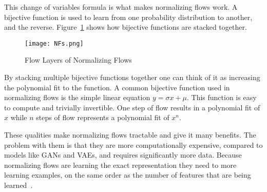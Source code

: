 This change of variables formula is what makes normalizing flows work. A
bijective function is used to learn from one probability distribution to
another, and the reverse. Figure~\ref{fig:nf} shows how bijective functions are
stacked together.

\begin{figure}[ht]
\center\texttt{[image: NFs.png]}
\caption{Flow Layers of Normalizing Flows~\cite{weng2018flow}}
\label{fig:nf}
\end{figure}

By stacking multiple bijective functions together one can think of it as
increasing the polynomial fit to the function. A common bijective function used
in normalizing flows is the simple linear equation $y = \sigma x + \mu$. This
function is easy to compute and trivially invertible. One step of flow results
in a polynomial fit of $x$ while $n$ steps of flow represents a polynomial fit
of $x^n$. 

These qualities make normalizing flows tractable and give it many benefits. The
problem with them is that they are more computationally expensive, compared to
models like GANs and VAEs, and requires significantly more data. Because
normalizing flows are learning the exact representation they need to more
learning examples, on the same order as the number of features that are being
learned~\cite{jainilecture}.
